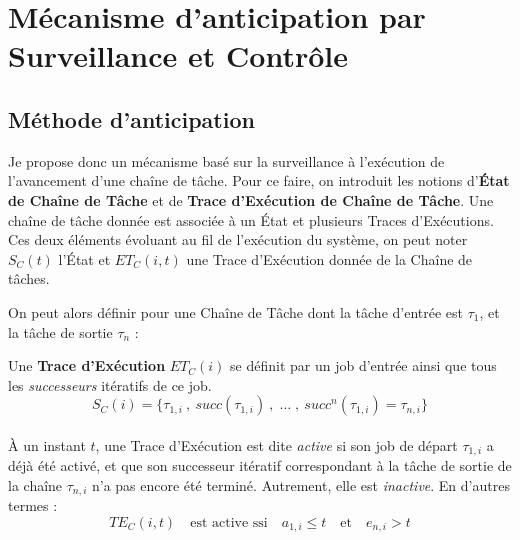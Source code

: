 \documentclass[french, a4paper, 11pt, twoside, pdftex]{StyleThese}
\begin{document}
    
\section{Mécanisme d'anticipation par Surveillance et Contrôle}
    \subsection{Méthode d'anticipation}
    
    Je propose donc un mécanisme basé sur la surveillance à l'exécution de l'avancement d'une chaîne de tâche. 
    Pour ce faire, on introduit les notions d'\textbf{État de Chaîne de Tâche} et de \textbf{Trace d'Exécution de Chaîne de Tâche}. Une chaîne de tâche donnée est associée à un État et plusieurs Traces d'Exécutions. Ces deux éléments évoluant au fil de l'exécution du système, on peut noter $S_C(t)$ l'État et $ET_C(i,t)$ une Trace d'Exécution donnée de la Chaîne de tâches.
    
    On peut alors définir pour une Chaîne de Tâche dont la tâche d'entrée est $\tau_{1}$, et la tâche de sortie $\tau_{n}$ : 
    \begin{definition}
    	Une \textbf{Trace d'Exécution} $ET_C(i)$ se définit par un job d'entrée ainsi que tous les \textit{successeurs} itératifs de ce job. \\
    	\begin{equation*}
    		S_C(i) = \{ \tau_{1,i} \:,\: succ(\tau_{1,i})\:, \;\dots\; ,\: succ^n(\tau_{1,i}) = \tau_{n,i} \}
    	\end{equation*} \\    	
    	À un instant $t$, une Trace d'Exécution est dite \emph{active} si son job de départ $\tau_{1,i}$ a déjà été activé, et que son successeur itératif correspondant à la tâche de sortie de la chaîne $\tau_{n,i}$ n'a pas encore été terminé. Autrement, elle est \textit{inactive}. En d'autres termes : \\
    	\begin{equation*}
    		TE_C(i,t)  \quad \textrm{est active ssi}\quad  a_{1,i} \leq t \quad \textrm{et} \quad e_{n,i} > t
    	\end{equation*} 
    \end{definition}
    
    
\end{document}
